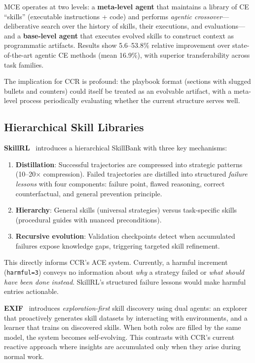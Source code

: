 \documentclass[11pt]{article}
\begin{document}
MCE operates at two levels: a \textbf{meta-level agent} that maintains a library of CE ``skills'' (executable instructions + code) and performs \textit{agentic crossover}---deliberative search over the history of skills, their executions, and evaluations---and a \textbf{base-level agent} that executes evolved skills to construct context as programmatic artifacts. Results show 5.6--53.8\% relative improvement over state-of-the-art agentic CE methods (mean 16.9\%), with superior transferability across task families.

The implication for CCR is profound: the playbook format (sections with slugged bullets and counters) could itself be treated as an evolvable artifact, with a meta-level process periodically evaluating whether the current structure serves well.

\subsection{Hierarchical Skill Libraries}

\textbf{SkillRL}~\cite{skillrl} introduces a hierarchical SkillBank with three key mechanisms:

\begin{enumerate}[leftmargin=*]
    \item \textbf{Distillation}: Successful trajectories are compressed into strategic patterns (10--20$\times$ compression). Failed trajectories are distilled into structured \textit{failure lessons} with four components: failure point, flawed reasoning, correct counterfactual, and general prevention principle.
    \item \textbf{Hierarchy}: General skills (universal strategies) versus task-specific skills (procedural guides with nuanced preconditions).
    \item \textbf{Recursive evolution}: Validation checkpoints detect when accumulated failures expose knowledge gaps, triggering targeted skill refinement.
\end{enumerate}

This directly informs CCR's ACE system. Currently, a harmful increment (\texttt{harmful=3}) conveys no information about \textit{why} a strategy failed or \textit{what should have been done instead}. SkillRL's structured failure lessons would make harmful entries actionable.

\textbf{EXIF}~\cite{exif} introduces \textit{exploration-first} skill discovery using dual agents: an explorer that proactively generates skill datasets by interacting with environments, and a learner that trains on discovered skills. When both roles are filled by the same model, the system becomes self-evolving. This contrasts with CCR's current reactive approach where insights are accumulated only when they arise during normal work.
\end{document}
